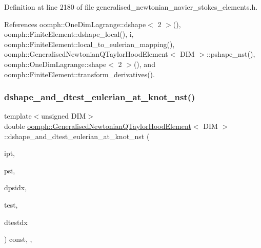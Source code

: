 Definition at line 2180 of file generalised\+\_\+newtonian\+\_\+navier\+\_\+stokes\+\_\+elements.\+h.



References oomph\+::\+One\+Dim\+Lagrange\+::dshape$<$ 2 $>$(), oomph\+::\+Finite\+Element\+::dshape\+\_\+local(), i, oomph\+::\+Finite\+Element\+::local\+\_\+to\+\_\+eulerian\+\_\+mapping(), oomph\+::\+Generalised\+Newtonian\+Q\+Taylor\+Hood\+Element$<$ D\+I\+M $>$\+::pshape\+\_\+nst(), oomph\+::\+One\+Dim\+Lagrange\+::shape$<$ 2 $>$(), and oomph\+::\+Finite\+Element\+::transform\+\_\+derivatives().

\mbox{\label{classoomph_1_1GeneralisedNewtonianQTaylorHoodElement_afdcac4f4f58a5f7e525454914a9fa2d3}} 
\subsubsection{\texorpdfstring{dshape\+\_\+and\+\_\+dtest\+\_\+eulerian\+\_\+at\+\_\+knot\+\_\+nst()}{dshape\_and\_dtest\_eulerian\_at\_knot\_nst()}\hspace{0.1cm}{\footnotesize\ttfamily [1/4]}}
{\footnotesize\ttfamily template$<$unsigned D\+IM$>$ \\
double \hyperlink{classoomph_1_1GeneralisedNewtonianQTaylorHoodElement}{oomph\+::\+Generalised\+Newtonian\+Q\+Taylor\+Hood\+Element}$<$ D\+IM $>$\+::dshape\+\_\+and\+\_\+dtest\+\_\+eulerian\+\_\+at\+\_\+knot\+\_\+nst (\begin{DoxyParamCaption}\item[{const unsigned \&}]{ipt,  }\item[{\hyperlink{classoomph_1_1Shape}{Shape} \&}]{psi,  }\item[{\hyperlink{classoomph_1_1DShape}{D\+Shape} \&}]{dpsidx,  }\item[{\hyperlink{classoomph_1_1Shape}{Shape} \&}]{test,  }\item[{\hyperlink{classoomph_1_1DShape}{D\+Shape} \&}]{dtestdx }\end{DoxyParamCaption}) const\hspace{0.3cm}{\ttfamily [inline]}, {\ttfamily [protected]}, {\ttfamily [virtual]}}



